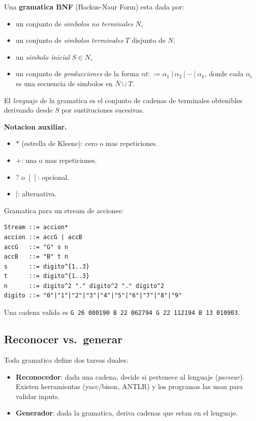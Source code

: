 \documentclass[12pt,a4paper]{article}
\begin{document}
\begin{definicionbox}
Una \textbf{gramatica BNF} (Backus-Naur Form) esta dada por:
\begin{itemize}
  \item un conjunto de \emph{simbolos no terminales} $N$,
  \item un conjunto de \emph{simbolos terminales} $T$ disjunto de $N$,
  \item un \emph{simbolo inicial} $S \in N$,
  \item un conjunto de \emph{producciones} de la forma
  $\textit{nt} ::= \alpha_1\ |\ \alpha_2\ |\ \cdots\ |\ \alpha_k$, donde cada $\alpha_i$ es una
  secuencia de simbolos en $N \cup T$.
\end{itemize}
El \emph{lenguaje} de la gramatica es el conjunto de cadenas de terminales obtenibles
derivando desde $S$ por sustituciones sucesivas.
\end{definicionbox}

\textbf{Notacion auxiliar.}

\begin{itemize}
  \item $*$ (estrella de Kleene): cero o mas repeticiones.
  \item $+$: una o mas repeticiones.
  \item $?$ o $[\,]$: opcional.
  \item $|$: alternativa.
\end{itemize}

\begin{ejemplobox}
Gramatica para un stream de acciones:
\begin{lstlisting}[style=codestyle]
Stream ::= accion*
accion ::= accG | accB
accG   ::= "G" s n
accB   ::= "B" t n
s      ::= digito^{1..3}
t      ::= digito^{1..3}
n      ::= digito^2 "." digito^2 "." digito^2
digito ::= "0"|"1"|"2"|"3"|"4"|"5"|"6"|"7"|"8"|"9"
\end{lstlisting}
Una cadena valida es \texttt{G 26 080190 B 22 062794 G 22 112194 B 13 010903}.
\end{ejemplobox}

\subsection{Reconocer vs.\ generar}

Toda gramatica define dos tareas duales:

\begin{itemize}
  \item \textbf{Reconocedor}: dada una cadena, decide si pertenece al lenguaje (\emph{parsear}).
  Existen herramientas (yacc/bison, ANTLR) y los programas las usan para validar inputs.
  \item \textbf{Generador}: dada la gramatica, deriva cadenas que estan en el lenguaje.
\end{itemize}
\end{document}
